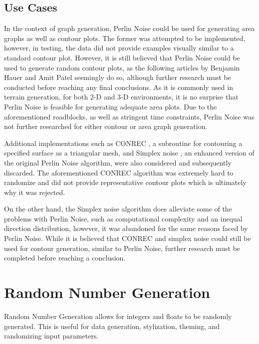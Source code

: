 \subsection{Use Cases}
In the context of graph generation, Perlin Noise could be used for generating area graphs as well as contour plots. The former was attempted to be implemented, however, in testing, the data did not provide examples visually similar to a standard contour plot. However, it is still believed that Perlin Noise could be used to generate random contour plots, as the following articles by Benjamin Hauer \cite{hauer_2019} and Amit Patel \cite{patel_2015} seemingly do so, although further research must be conducted before reaching any final conclusions. As it is commonly used in terrain generation, for both 2-D and 3-D environments, it is no surprise that Perlin Noise is feasible for generating adequate area plots. Due to the aforementioned roadblocks, as well as stringent time constraints, Perlin Noise was not further researched for either contour or area graph generation. 

\hfill

Additional implementations such as CONREC \cite{bourke_1987}, a subroutine for contouring a specified surface as a triangular mesh, and Simplex noise \cite{gustavson_2005}, an enhanced version of the original Perlin Noise algorithm, were also considered and subsequently discarded. The aforementioned CONREC algorithm was extremely hard to randomize and did not provide representative contour plots which is ultimately why it was rejected.

\hfill

On the other hand, the Simplex noise algorithm does alleviate some of the problems with Perlin Noise, such as computational complexity and an inequal direction distribution, however, it was abandoned for the same reasons faced by Perlin Noise. While it is believed that CONREC and simplex noise could still be used for contour generation, similar to Perlin Noise, further research must be completed before reaching a conclusion.

\section{Random Number Generation}
\label{section:random_number_generation}
Random Number Generation allows for integers and floats to be randomly generated. This is useful for data generation, stylization, theming, and randomizing input parameters.

